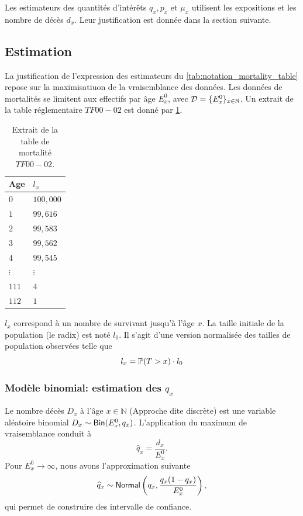 Les estimateurs des quantités d'intérêts $q_x, p_x$ et $\mu_x$ utilisent les expositions et les nombre de décès $d_x$. Leur justification est donnée dans la section suivante.
\subsection{Estimation}
La justification de l'expression des estimateurs du \cref{tab:notation_mortality_table} repose sur la maximisatiuon de la vraisemblance des données. Les données de mortalités se limitent aux effectifs par âge $E^0_x$, avec $\mathcal{D} = \{E^0_x\}_{x\in\mathbb{N}}$. Un extrait de la table réglementaire $TF 00-02$ est donné par \cref{tab:TF002}.
\begin{table}[ht!]
\centering
\begin{tabular}{ll}
  \hline
 Age & $l_x$ \\ 
  \hline
 $0$ & $100,000 $\\ 
 $1$ &$ 99,616 $\\ 
 $2$ &$ 99,583 $\\ 
 $3$ &$ 99,562 $\\ 
 $4$ &$ 99,545 $\\ 
 $\vdots$ &$\vdots $\\
 $111$ & $4$ \\ 
 $112$ & $1$ \\ 
   \hline
\end{tabular}
\caption{Extrait de la table de mortalité $TF 00-02$.}
\label{tab:TF002}
\end{table}
\begin{remark}
$l_x$ correspond à un nombre de survivant jusqu'à l'âge $x$. La taille initiale de la population (le radix) est noté $l_0$. Il s'agit d'une version normalisée des tailles de population observées telle que 
$$
l_x = \mathbb{P}(T>x)\cdot l_0
$$
\end{remark}

\subsubsection{Modèle binomial: estimation des $q_x$}\label{ssec:deces_binomial}
Le nombre décès $D_x$ à l'âge $x\in\mathbb{N}$ (Approche dite discrète) est une variable aléatoire binomial $D_x\sim \mathsf{Bin}(E^0_x, q_x)$. L'application du maximum de vraisemblance conduit à 
$$
\widehat{q}_x = \frac{d_x}{E^0_x}.
$$
Pour $E^0_x\rightarrow \infty$, nous avons l'approximation suivante 
$$
\widehat{q}_x\sim\mathsf{Normal}\left(q_x, \frac{q_x(1-q_x)}{E^0_x}\right),
$$
qui permet de construire des intervalle de confiance.

